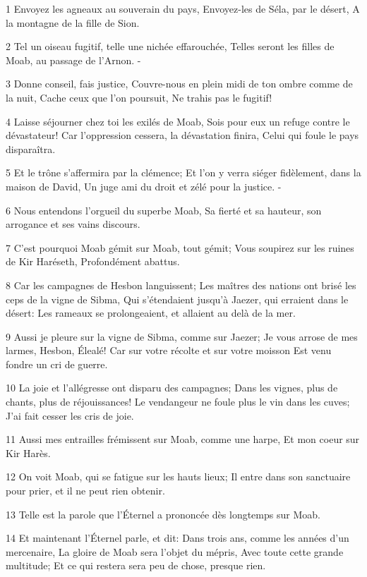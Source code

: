 \par 1 Envoyez les agneaux au souverain du pays, Envoyez-les de Séla, par le désert, A la montagne de la fille de Sion.
\par 2 Tel un oiseau fugitif, telle une nichée effarouchée, Telles seront les filles de Moab, au passage de l'Arnon. -
\par 3 Donne conseil, fais justice, Couvre-nous en plein midi de ton ombre comme de la nuit, Cache ceux que l'on poursuit, Ne trahis pas le fugitif!
\par 4 Laisse séjourner chez toi les exilés de Moab, Sois pour eux un refuge contre le dévastateur! Car l'oppression cessera, la dévastation finira, Celui qui foule le pays disparaîtra.
\par 5 Et le trône s'affermira par la clémence; Et l'on y verra siéger fidèlement, dans la maison de David, Un juge ami du droit et zélé pour la justice. -
\par 6 Nous entendons l'orgueil du superbe Moab, Sa fierté et sa hauteur, son arrogance et ses vains discours.
\par 7 C'est pourquoi Moab gémit sur Moab, tout gémit; Vous soupirez sur les ruines de Kir Haréseth, Profondément abattus.
\par 8 Car les campagnes de Hesbon languissent; Les maîtres des nations ont brisé les ceps de la vigne de Sibma, Qui s'étendaient jusqu'à Jaezer, qui erraient dans le désert: Les rameaux se prolongeaient, et allaient au delà de la mer.
\par 9 Aussi je pleure sur la vigne de Sibma, comme sur Jaezer; Je vous arrose de mes larmes, Hesbon, Élealé! Car sur votre récolte et sur votre moisson Est venu fondre un cri de guerre.
\par 10 La joie et l'allégresse ont disparu des campagnes; Dans les vignes, plus de chants, plus de réjouissances! Le vendangeur ne foule plus le vin dans les cuves; J'ai fait cesser les cris de joie.
\par 11 Aussi mes entrailles frémissent sur Moab, comme une harpe, Et mon coeur sur Kir Harès.
\par 12 On voit Moab, qui se fatigue sur les hauts lieux; Il entre dans son sanctuaire pour prier, et il ne peut rien obtenir.
\par 13 Telle est la parole que l'Éternel a prononcée dès longtemps sur Moab.
\par 14 Et maintenant l'Éternel parle, et dit: Dans trois ans, comme les années d'un mercenaire, La gloire de Moab sera l'objet du mépris, Avec toute cette grande multitude; Et ce qui restera sera peu de chose, presque rien.

